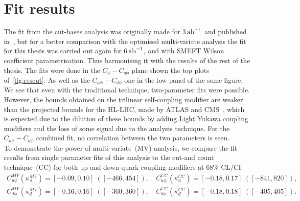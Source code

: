 \section{Fit results\label{sec:resultsly}}
The fit from the cut-bases analysis was originally made for 3$\,{\rm ab}^{-1}$ and published in~\cite{Alasfar:2019pmn}, but for a better comparison with the optimised multi-variate analysis the fit for this thesis was carried out again for 6$\,{\rm ab}^{-1}$, and with SMEFT Wilson coefficient parametrisation. Thus harmonising it with the results of the rest of the thesis. The fits were done in the $C_\phi-C_{q\phi}$ plane shown the top plots of~\autoref{fig:rescut}. As well as the $C_{u\phi}-C_{d\phi}$ one in the low panel of the same figure.  We see that even with the traditional technique, two-parameter fits were possible. However, the bounds obtained on the trilinear self-coupling modifier are weaker than the projected bounds for the HL-LHC, made by ATLAS and CMS~\cite{ATL-PHYS-PUB-2018-053,ATLAS:2018rvj,CMS-PAS-FTR-18-011}, which is expected due to the dilution of these bounds by adding Light Yukawa coupling modifiers and the loss of some signal due to the analysis technique. For the $C_{u\phi}-C_{d\phi}$  combined fit, no correlation between the two parameters is seen. \\ To demonstrate the power of multi-variate~(MV) analysis, we compare the fit results from single parameter fits of this analysis to the cut-and count technique~(CC) for both up and down quark coupling modifiers at 68\% CL/CI 
\begin{eqnarray}
	C_{u\phi}^{MV} \left(\kappa_u^{MV}\right) = [-0.09, 0.10] \;([-466, 454]),\quad C_{u\phi}^{CC} (\kappa_u^{CC}) = [-0.18, 0.17] \;([-841, 820]), \nonumber\\
	C_{d\phi}^{MV} (\kappa_d^{MV}) = [-0.16, 0.16] \;([-360, 360]),\quad C_{d\phi}^{CC} (\kappa_d^{CC}) = [-0.18, 0.18] \;([-405, 405]). \nonumber\\
\end{eqnarray}
